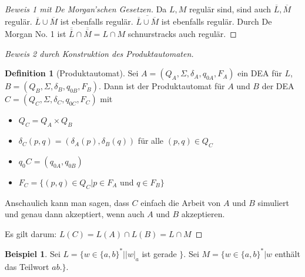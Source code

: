 \documentclass[11pt]{article} %
\theoremstyle{definition}
\newtheorem*{beispiel}{Beispiel}
\newtheorem{definition}{Definition}
\begin{document}
\begin{description}
\begin{proof}[Beweis 1 mit De Morgan'schen Gesetzen]
Da $L, M$ regulär sind, sind auch $\overline{L}, \overline{M}$ regulär. $\overline{L} \cup \overline{M}$ ist ebenfalls regulär. $\overline{\overline{L} \cup \overline{M}}$ ist ebenfalls regulär. Durch De Morgan No. 1 ist $\overline{\overline{L}} \cap \overline{\overline{M}} = L \cap M$ schnurstracks auch regulär.

\end{proof}

\begin{proof}[Beweis 2 durch Konstruktion des Produktautomaten]

\begin{definition}[Produktautomat]
Sei $A = (Q_A, \Sigma, \delta_A, q_{0A}, F_A)$ ein DEA für $L$, $B = (Q_B, \Sigma, \delta_B, q_{0B}, F_B)$. Dann ist der Produktautomat für $A$ und $B$ der DEA $C = (Q_C, \Sigma, \delta_C, q_{0C}, F_C)$ mit
\begin{itemize}
\item $Q_C = Q_A \times Q_B$
\item $\delta_C(p, q) = (\delta_A(p), \delta_B(q))$ für alle $(p, q) \in Q_C$
\item $q_0C = (q_{0A}, q_{0B})$
\item $F_C = \{(p, q) \in Q_C | p \in F_A $ und $ q \in F_B \}$
\end{itemize}

\end{definition}

Anschaulich kann man sagen, dass $C$ einfach die Arbeit von $A$ und $B$ simuliert und genau dann akzeptiert, wenn auch $A$ und $B$ akzeptieren.

Es gilt darum: $L(C) = L(A) \cap L(B) = L \cap M$

\end{proof}

\begin{beispiel}
Sei $L = \{ w \in \{a, b\}^* | |w|_a $ ist gerade $\}$. Sei $M = \{ w \in \{a, b\}^* | w $ enthält das Teilwort  $ab $.$\}$.
\end{beispiel}


\end{description}
\end{document}
